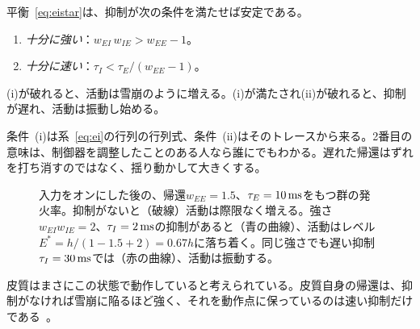 \begin{keyblock}
\begin{proposition}[安定性の条件]
\label{prop:ei}
平衡~\eqref{eq:eistar}は、抑制が次の条件を満たせば安定である。
\begin{enumerate}
\item[(i)] \emph{十分に強い}：$w_{EI}\,w_{IE} > w_{EE}-1$。
\item[(ii)] \emph{十分に速い}：$\tau_I < \tau_E/(w_{EE}-1)$。
\end{enumerate}
(i)が破れると、活動は雪崩のように増える。(i)が満たされ(ii)が破れると、抑制が遅れ、活動は振動し始める。
\end{proposition}
\end{keyblock}

条件~(i)は系~\eqref{eq:ei}の行列の行列式、条件~(ii)はそのトレースから来る。2番目の意味は、制御器を調整したことのある人なら誰にでもわかる。遅れた帰還はずれを打ち消すのではなく、揺り動かして大きくする。

\begin{figure}[t]
\centering
{}
\caption{入力をオンにした後の、帰還$w_{EE}=1.5$、$\tau_E=10\,\text{ms}$をもつ群の発火率。抑制がないと（破線）活動は際限なく増える。強さ$w_{EI}w_{IE}=2$、$\tau_I=2\,\text{ms}$の抑制があると（青の曲線）、活動はレベル$E^*=h/(1-1.5+2)=0.67h$に落ち着く。同じ強さでも遅い抑制$\tau_I=30\,\text{ms}$では（赤の曲線）、活動は振動する。}
\label{fig:ei}
\end{figure}

皮質はまさにこの状態で動作していると考えられている。皮質自身の帰還は、抑制がなければ雪崩に陥るほど強く、それを動作点に保っているのは速い抑制だけである~\cite{Tsodyks1997isn}。

